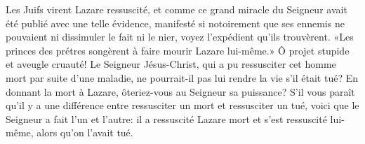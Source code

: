 Les Juifs virent Lazare ressuscité,
	et comme ce grand miracle du Seigneur
		avait été publié avec une telle évidence,
	manifesté si notoirement
		que ses ennemis ne pouvaient ni dissimuler le fait ni le nier,
	voyez l’expédient qu’ils trouvèrent.
«Les princes des prétres songèrent à faire mourir Lazare lui-même.»
Ô projet stupide et aveugle cruauté!
	Le Seigneur Jésus-Christ,
	qui a pu ressusciter cet homme mort par suite d’une maladie,
	ne pourrait-il pas lui rendre la vie s’il était tué?
En donnant la mort à Lazare, ôteriez-vous au Seigneur sa puissance?
S’il vous paraît qu’il y a une différence
	entre ressusciter un mort et ressusciter un tué,
	voici que le Seigneur a fait l’un et l’autre:
	il a ressuscité Lazare mort
	et s’est ressuscité lui-même, alors qu’on l’avait tué.
